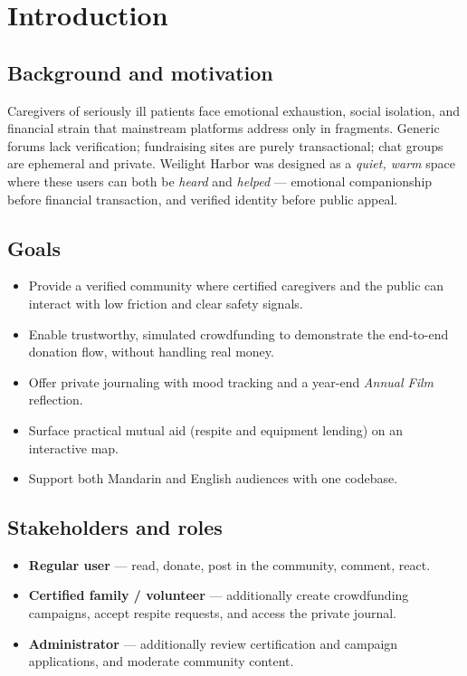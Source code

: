 \section{Introduction}

\subsection{Background and motivation}
Caregivers of seriously ill patients face emotional exhaustion, social
isolation, and financial strain that mainstream platforms address only in
fragments. Generic forums lack verification; fundraising sites are
purely transactional; chat groups are ephemeral and private. Weilight
Harbor was designed as a \emph{quiet, warm} space where these users can
both be \emph{heard} and \emph{helped} — emotional companionship before
financial transaction, and verified identity before public appeal.

\subsection{Goals}
\begin{itemize}
  \item Provide a verified community where certified caregivers and the
        public can interact with low friction and clear safety signals.
  \item Enable trustworthy, simulated crowdfunding to demonstrate the
        end-to-end donation flow, without handling real money.
  \item Offer private journaling with mood tracking and a year-end
        \emph{Annual Film} reflection.
  \item Surface practical mutual aid (respite and equipment lending) on
        an interactive map.
  \item Support both Mandarin and English audiences with one codebase.
\end{itemize}

\subsection{Stakeholders and roles}
\begin{itemize}
  \item \textbf{Regular user} — read, donate, post in the community,
        comment, react.
  \item \textbf{Certified family / volunteer} — additionally create
        crowdfunding campaigns, accept respite requests, and access the
        private journal.
  \item \textbf{Administrator} — additionally review certification and
        campaign applications, and moderate community content.
\end{itemize}

